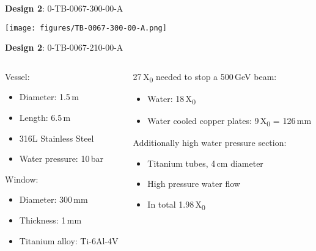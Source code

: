 \documentclass[xcolor={dvipsnames}]{beamer}
\begin{document}
\begin{frame}{\textbf{Design 2}: 0-TB-0067-300-00-A}
\begin{center}
  \texttt{[image: figures/TB-0067-300-00-A.png]}
 \end{center}
\end{frame}
{
\begin{frame}{\textbf{Design 2}: 0-TB-0067-210-00-A}
\begin{columns}
 \begin{column}{0.5\textwidth}
  Vessel:
  \begin{itemize}
   \item Diameter: 1.5\,m
   \item Length: 6.5\,m
   \item 316L Stainless Steel
   \item Water pressure: 10\,bar
  \end{itemize}
  Window:
  \begin{itemize}
   \item Diameter: 300\,mm
   \item Thickness: 1\,mm
   \item Titanium alloy: Ti-6Al-4V 
  \end{itemize}
 \end{column}
 \begin{column}{0.5\textwidth}
  27\,X\textsubscript{0} needed to stop a 500\,GeV beam:
  \begin{itemize}
   \item Water: 18\,X\textsubscript{0}
   \item Water cooled copper plates: 9\,X\textsubscript{0} = 126\,mm
  \end{itemize}  
    Additionally high water pressure section:
  \begin{itemize}
   \item Titanium tubes, 4\,cm diameter
   \item High pressure water flow
   \item In total 1.98\,X\textsubscript{0}
  \end{itemize} 
 \end{column}
\end{columns}

\end{frame}
}
\end{document}
